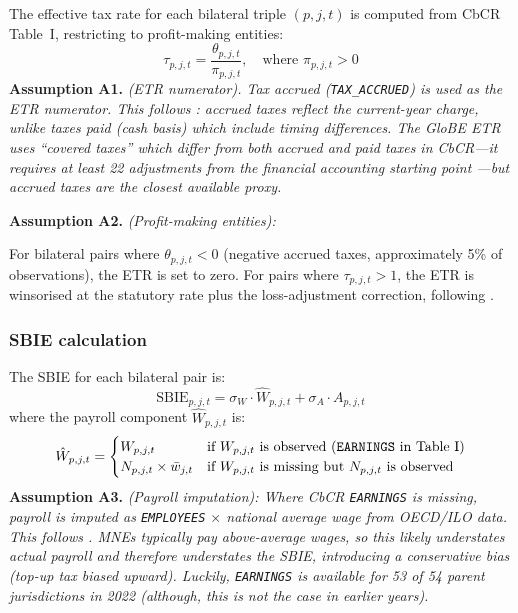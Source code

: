 \documentclass[11pt,a4paper]{article}
\newcommand{\code}[1]{\texttt{#1}}
\newcommand{\assumption}[2]{\noindent\textbf{Assumption #1.} \textit{#2}\medskip}
\begin{document}
The effective tax rate for each bilateral triple $(p, j, t)$ is computed from CbCR Table~I, restricting to profit-making entities:
\begin{equation}\label{eq:etr}
\tau_{p,j,t} = \frac{\theta_{p,j,t}}{\pi_{p,j,t}}, \quad \text{where } \pi_{p,j,t} > 0
\end{equation}
\assumption{A1}{(ETR numerator). Tax accrued (\code{TAX\_ACCRUED}) is used as the ETR numerator. This follows \citet{hugger2026}: accrued taxes reflect the current-year charge, unlike taxes paid (cash basis) which include timing differences. The GloBE ETR uses ``covered taxes'' which differ from both accrued and paid taxes in CbCR---it requires at least 22 adjustments from the financial accounting starting point \citep{hanlon2023}---but accrued taxes are the closest available proxy.}

\assumption{A2}{(Profit-making entities): }

For bilateral pairs where $\theta_{p,j,t} < 0$ (negative accrued taxes, approximately 5\% of observations), the ETR is set to zero. For pairs where $\tau_{p,j,t} > 1$, the ETR is winsorised at the statutory rate plus the loss-adjustment correction, following \citet{hugger2026}.

\subsubsection{SBIE calculation}\label{sec:sbie_calc}

The SBIE for each bilateral pair is:
\begin{equation}\label{eq:sbie}
\text{SBIE}_{p,j,t} = \sigma_W \cdot \hat{W}_{p,j,t} + \sigma_A \cdot A_{p,j,t}
\end{equation}
where the payroll component $\hat{W}_{p,j,t}$ is:
\begin{equation}\label{eq:payroll}
\hat{W}_{p,j,t} = \begin{cases}
W_{p,j,t} & \text{if } W_{p,j,t} \text{ is observed (\code{EARNINGS} in Table~I)} \\
N_{p,j,t} \times \bar{w}_{j,t} & \text{if } W_{p,j,t} \text{ is missing but } N_{p,j,t} \text{ is observed}
\end{cases}
\end{equation}
\assumption{A3}{(Payroll imputation): Where CbCR \code{EARNINGS} is missing, payroll is imputed as \code{EMPLOYEES} $\times$ national average wage from OECD/ILO data. This follows \citet{barake2022}. MNEs typically pay above-average wages, so this likely \emph{understates} actual payroll and therefore understates the SBIE, introducing a conservative bias (top-up tax biased upward). Luckily, \code{EARNINGS} is available for 53 of 54 parent jurisdictions in 2022 (although, this is not the case in earlier years).}
\end{document}
